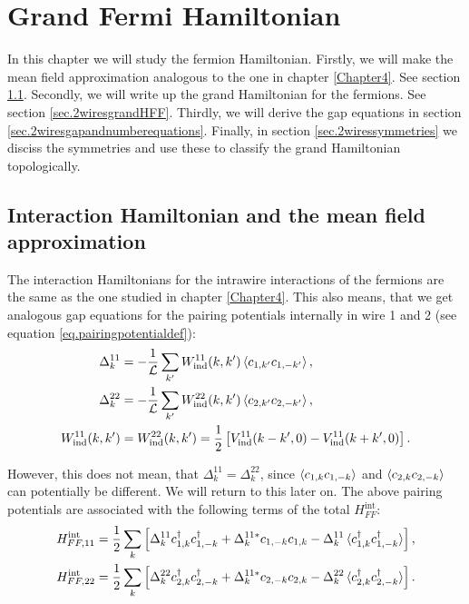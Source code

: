 
\chapter{Grand Fermi Hamiltonian} %

\label{Chapter9} %


In this chapter we will study the fermion Hamiltonian. Firstly, we will make the mean field approximation analogous to the one in chapter \ref{Chapter4}. See section \ref{sec.2wiresmeanfieldapproximation}. Secondly, we will write up the grand Hamiltonian for the fermions. See section \ref{sec.2wiresgrandHFF}. Thirdly, we will derive the gap equations in section \ref{sec.2wiresgapandnumberequations}. Finally, in section \ref{sec.2wiressymmetries} we disciss the symmetries and use these to classify the grand Hamiltonian topologically. 

\section{Interaction Hamiltonian and the mean field approximation}
\label{sec.2wiresmeanfieldapproximation}
The interaction Hamiltonians for the intrawire interactions of the fermions are the same as the one studied in chapter \ref{Chapter4}. This also means, that we get analogous gap equations for the pairing potentials internally in wire 1 and 2 (see equation \ref{eq.pairingpotentialdef}):
\begin{align}
\Delta^{11}_k &= -\frac{1}{\mathcal{L}} \sum_{k'} W_{\text{ind}}^{11}(k,k')\braket{c_{1,k'}c_{1,-k'}}, \nonumber \\
\Delta^{22}_k &= -\frac{1}{\mathcal{L}} \sum_{k'} W_{\text{ind}}^{22}(k,k')\braket{c_{2,k'}c_{2,-k'}}, \nonumber \\
W_{\text{ind}}^{11}(k,k') &= W_{\text{ind}}^{22}(k,k') = \frac{1}{2}\left[V_{\text{ind}}^{11}(k-k',0) - V_{\text{ind}}^{11}(k+k',0) \right].
\label{eq.pairingpotentialsintrawire}
\end{align}

However, this does not mean, that $\Delta^{11}_k = \Delta^{22}_k$, since $\braket{c_{1,k}c_{1,-k}}$ and $\braket{c_{2,k}c_{2,-k}}$ can potentially be different. We will return to this later on. The above pairing potentials are associated with the following terms of the total $H^\text{int}_{FF}$:
\begin{align}
H^\text{int}_{FF,11} &= \frac{1}{2}\sum_k \left[\Delta^{11}_k c^\dagger_{1,k}c^\dagger_{1,-k} + \Delta^{11 *}_k c_{1,-k}c_{1,k} - \Delta^{11}_k\braket{c^\dagger_{1,k}c^\dagger_{1,-k}} \right], \nonumber \\
H^\text{int}_{FF,22} &= \frac{1}{2}\sum_k \left[\Delta^{22}_k c^\dagger_{2,k}c^\dagger_{2,-k} + \Delta^{11 *}_k c_{2,-k}c_{2,k} - \Delta^{22}_k\braket{c^\dagger_{2,k}c^\dagger_{2,-k}} \right].
\label{eq.Hintintrawire}
\end{align}


